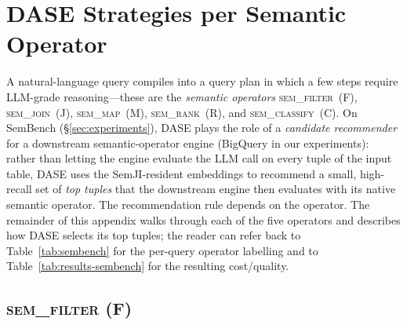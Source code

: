 %   

\appendix

\section{DASE Strategies per Semantic Operator}
\label{app:sembench-strategies}

A natural-language query compiles into a query plan in which a few steps
require LLM-grade reasoning---these are the \emph{semantic operators}
\textsc{sem\_filter}~(F), \textsc{sem\_join}~(J), \textsc{sem\_map}~(M),
\textsc{sem\_rank}~(R), and \textsc{sem\_classify}~(C). On SemBench
(\S\ref{sec:experiments}), DASE plays the role of a \emph{candidate
recommender} for a downstream semantic-operator engine (BigQuery in our
experiments): rather than letting the engine evaluate the LLM call on
every tuple of the input table, DASE uses the SemJI-resident embeddings
to recommend a small, high-recall set of \emph{top tuples} that the
downstream engine then evaluates with its native semantic operator. The
recommendation rule depends on the operator. The remainder of this
appendix walks through each of the five operators and describes how DASE
selects its top tuples; the reader can refer back to Table~\ref{tab:sembench}
for the per-query operator labelling and to Table~\ref{tab:results-sembench}
for the resulting cost/quality.

\subsection{\textsc{sem\_filter} (F)}

